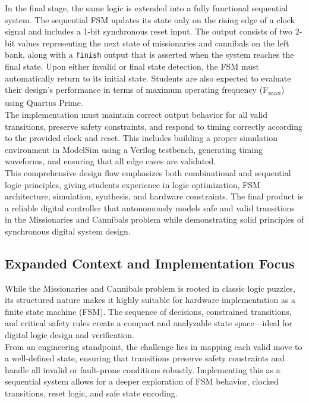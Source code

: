 \documentclass[10pt,a4paper]{article}
\begin{document}
\noindent In the final stage, the same logic is extended into a fully functional sequential system. The sequential FSM updates its state only on the rising edge of a clock signal and includes a 1-bit synchronous reset input. The output consists of two 2-bit values representing the next state of missionaries and cannibals on the left bank, along with a \texttt{finish} output that is asserted when the system reaches the final state. Upon either invalid or final state detection, the FSM must automatically return to its initial state. Students are also expected to evaluate their design’s performance in terms of maximum operating frequency (F\textsubscript{max}) using Quartus Prime.\\

\noindent The implementation must maintain correct output behavior for all valid transitions, preserve safety constraints, and respond to timing correctly according to the provided clock and reset. This includes building a proper simulation environment in ModelSim using a Verilog testbench, generating timing waveforms, and ensuring that all edge cases are validated.\\

\noindent This comprehensive design flow emphasizes both combinational and sequential logic principles, giving students experience in logic optimization, FSM architecture, simulation, synthesis, and hardware constraints. The final product is a reliable digital controller that autonomously models safe and valid transitions in the Missionaries and Cannibals problem while demonstrating solid principles of synchronous digital system design.

\subsection*{Expanded Context and Implementation Focus}

\noindent While the Missionaries and Cannibals problem is rooted in classic logic puzzles, its structured nature makes it highly suitable for hardware implementation as a finite state machine (FSM). The sequence of decisions, constrained transitions, and critical safety rules create a compact and analyzable state space—ideal for digital logic design and verification.\\

\noindent From an engineering standpoint, the challenge lies in mapping each valid move to a well-defined state, ensuring that transitions preserve safety constraints and handle all invalid or fault-prone conditions robustly. Implementing this as a sequential system allows for a deeper exploration of FSM behavior, clocked transitions, reset logic, and safe state encoding.
\end{document}
